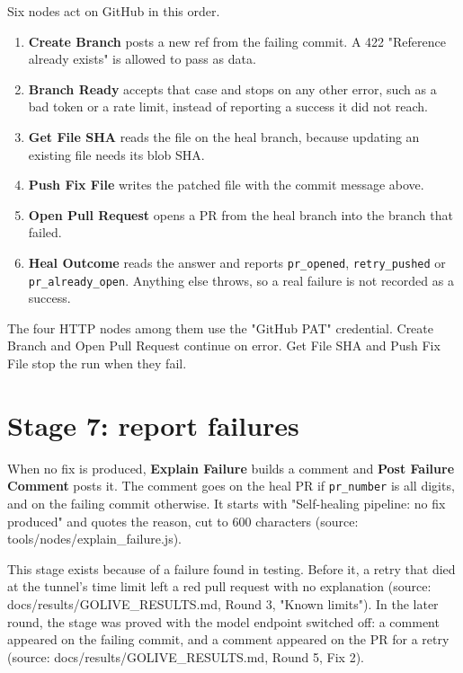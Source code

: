 Six nodes act on GitHub in this order.

\begin{enumerate}[leftmargin=*, itemsep=2pt]
\item \textbf{Create Branch} posts a new ref from the failing commit. A 422 "Reference already exists" is allowed to pass as data.
\item \textbf{Branch Ready} accepts that case and stops on any other error, such as a bad token or a rate limit, instead of reporting a success it did not reach.
\item \textbf{Get File SHA} reads the file on the heal branch, because updating an existing file needs its blob SHA.
\item \textbf{Push Fix File} writes the patched file with the commit message above.
\item \textbf{Open Pull Request} opens a PR from the heal branch into the branch that failed.
\item \textbf{Heal Outcome} reads the answer and reports \texttt{pr\_\allowbreak{}opened}, \texttt{retry\_\allowbreak{}pushed} or \texttt{pr\_\allowbreak{}already\_\allowbreak{}open}. Anything else throws, so a real failure is not recorded as a success.
\end{enumerate}

The four HTTP nodes among them use the "GitHub PAT" credential. Create Branch and Open Pull Request continue on error. Get File SHA and Push Fix File stop the run when they fail.

\section{Stage 7: report failures}

When no fix is produced, \textbf{Explain Failure} builds a comment and \textbf{Post Failure Comment} posts it. The comment goes on the heal PR if \texttt{pr\_\allowbreak{}number} is all digits, and on the failing commit otherwise. It starts with "Self-healing pipeline: no fix produced" and quotes the reason, cut to 600 characters (source: tools/\allowbreak{}nodes/\allowbreak{}explain\_\allowbreak{}failure.js).

This stage exists because of a failure found in testing. Before it, a retry that died at the tunnel's time limit left a red pull request with no explanation (source: docs/\allowbreak{}results/\allowbreak{}GOLIVE\_\allowbreak{}RESULTS.md, Round 3, "Known limits"). In the later round, the stage was proved with the model endpoint switched off: a comment appeared on the failing commit, and a comment appeared on the PR for a retry (source: docs/\allowbreak{}results/\allowbreak{}GOLIVE\_\allowbreak{}RESULTS.md, Round 5, Fix 2).

